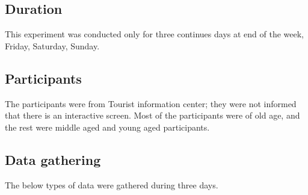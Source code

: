 \subsection{Duration}
This experiment was conducted only for three continues days at end of the week, Friday, Saturday, Sunday.

\subsection{Participants}
The participants were from Tourist information center; they were not informed that there is an interactive screen. Most of the participants were of old age, and the rest were middle aged and young aged participants. 

\subsection{Data gathering}
The below types of data were gathered during three days.

